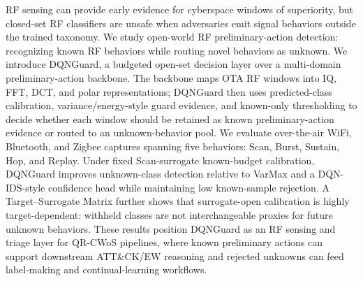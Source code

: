 RF sensing can provide early evidence for cyberspace windows of superiority, but closed-set RF classifiers are unsafe when adversaries emit signal behaviors outside the trained taxonomy. We study open-world RF preliminary-action detection: recognizing known RF behaviors while routing novel behaviors as unknown. We introduce DQNGuard, a budgeted open-set decision layer over a multi-domain preliminary-action backbone. The backbone maps OTA RF windows into IQ, FFT, DCT, and polar representations; DQNGuard then uses predicted-class calibration, variance/energy-style guard evidence, and known-only thresholding to decide whether each window should be retained as known preliminary-action evidence or routed to an unknown-behavior pool. We evaluate over-the-air WiFi, Bluetooth, and Zigbee captures spanning five behaviors: Scan, Burst, Sustain, Hop, and Replay. Under fixed Scan-surrogate known-budget calibration, DQNGuard improves unknown-class detection relative to VarMax and a DQN-IDS-style confidence head while maintaining low known-sample rejection. A Target--Surrogate Matrix further shows that surrogate-open calibration is highly target-dependent: withheld classes are not interchangeable proxies for future unknown behaviors. These results position DQNGuard as an RF sensing and triage layer for QR-CWoS pipelines, where known preliminary actions can support downstream ATT\&CK/EW reasoning and rejected unknowns can feed label-making and continual-learning workflows.
